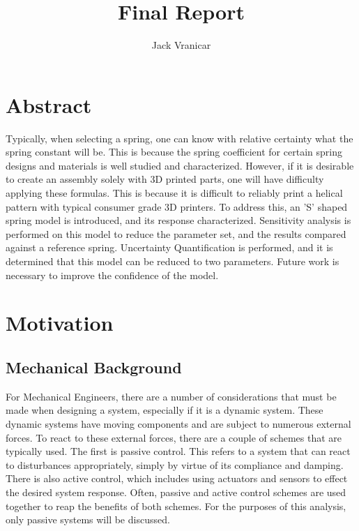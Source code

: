 \documentclass[conference]{article}
\title{\LARGE \bf
Final Report
}
\author{
    Jack Vranicar
}
\begin{document}
\maketitle

\thispagestyle{empty}
\pagestyle{empty}

\section{Abstract}

Typically, when selecting a spring, one can know with relative certainty what the spring constant will be. This is because the spring coefficient for certain spring designs and materials is well studied and characterized. However, if it is desirable to create an assembly solely with 3D printed parts, one will have difficulty applying these formulas. This is because it is difficult to reliably print a helical pattern with typical consumer grade 3D printers. To address this, an 'S' shaped spring model is introduced, and its response characterized. Sensitivity analysis is performed on this model to reduce the parameter set, and the results compared against a reference spring. Uncertainty Quantification is performed, and it is determined that this model can be reduced to two parameters. Future work is necessary to improve the confidence of the model.
\section{Motivation}

\subsection{Mechanical Background}

For Mechanical Engineers, there are a number of considerations that must be made when designing a system, especially if it is a dynamic system. These dynamic systems have moving components and are subject to numerous external forces. To react to these external forces, there are a couple of schemes that are typically used. The first is passive control. This refers to a system that can react to disturbances appropriately, simply by virtue of its compliance and damping. There is also active control, which includes using actuators and sensors to effect the desired system response. Often, passive and active control schemes are used together to reap the benefits of both schemes. For the purposes of this analysis, only passive systems will be discussed.
\end{document}
